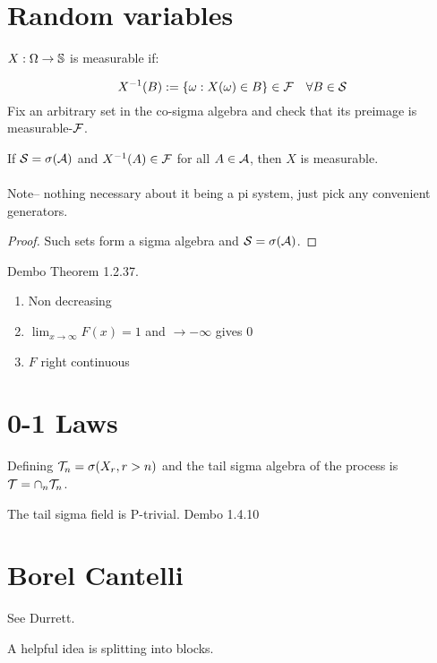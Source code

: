\documentclass{article}
\begin{document}
\section{Random variables}
\begin{definition}
$X: \Omega \to \mathbb S$ is measurable if:

$$X^{-1}(B):= \{\omega: X(\omega) \in B\} \in \mathcal F \quad \forall B\in \mathcal S$$
Fix an arbitrary set in the co-sigma algebra and check that its preimage is measurable-$\mathcal F$. 
\end{definition}
\begin{recipe}[Measurability]
If $\cal S = \sigma(\cal A)$ and $X^{-1} (A) \in \mathcal F$ for all $A\in \mathcal A$, then $X$ is measurable. \\\\
Note-- nothing necessary about it being a pi system, just pick any convenient generators.
\begin{proof}
	Such sets form a sigma algebra and $\cal S = \sigma(\cal A)$. 
\end{proof}
\end{recipe}


\begin{definition}
Dembo Theorem 1.2.37. 
\begin{enumerate}
	\item Non decreasing
	\item $\lim_{x\to \infty} F(x) = 1$ and $\to -\infty$ gives $0$
	\item $F$ right continuous  
\end{enumerate}
\end{definition}

\section{0-1 Laws}
\begin{definition}
Defining $\mathcal T_n = \sigma(X_r , r>n)$ and the tail sigma algebra of the process is $\mathcal T = \cap_n \mathcal T_n$.  
\end{definition}
\begin{theorem}[Kolmogorov 0-1]
The tail sigma field is P-trivial. Dembo 1.4.10
\end{theorem}

\section{Borel Cantelli} 
\begin{example}
See Durrett. 
\end{example}
A helpful idea is splitting into blocks.\\ \\
\end{document}
